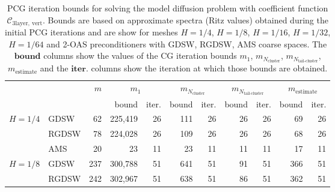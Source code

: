 \begin{table}[H]
\centering
\caption{PCG iteration bounds for solving the model diffusion problem with coefficient function $\mathcal{C}_{\mathrm{3layer, \ vert}}$. Bounds are based on approximate spectra (Ritz values) obtained during the initial PCG iterations and are show for meshes $H=1/4$, $H=1/8$, $H=1/16$, $H=1/32$, $H=1/64$ and 2-OAS preconditioners with GDSW, RGDSW, AMS coarse spaces. The $\textbf{bound}$ columns show the values of the CG iteration bounds $m_1$, $m_{N_{\text{cluster}}}$, $m_{N_{\text{tail-cluster}}}$, $m_{\text{estimate}}$ and the $\textbf{iter.}$ columns show the iteration at which those bounds are obtained.}
\label{tab:cg_iteration_bound_coef=3lvert}
\begin{tabular}{llrrrrrrrrr}
\toprule
 &  & \bfseries $m$ & \multicolumn{2}{|c|}{\bfseries $m_1$} & \multicolumn{2}{|c|}{\bfseries $m_{N_{\text{cluster}}}$} & \multicolumn{2}{|c|}{\bfseries $m_{N_{\text{tail-cluster}}}$} & \multicolumn{2}{|c|}{\bfseries $m_{\text{estimate}}$} \\
 &  &  & bound & iter. & bound & iter. & bound & iter. & bound & iter. \\
\midrule
\multirow[c]{3}{*}{\bfseries $H=1/4$} & GDSW & 62 & {\cellcolor[HTML]{E2E4FB}} \color[HTML]{000000} 225,419 & 26 & {\cellcolor[HTML]{ACB8F4}} \color[HTML]{000000} 111 & 26 & {\cellcolor[HTML]{768BEC}} \color[HTML]{F1F1F1} 26 & 26 & {\cellcolor[HTML]{405FE5}} \color[HTML]{F1F1F1} 69 & 26 \\
\cline{2-11}
\bfseries  & RGDSW & 78 & {\cellcolor[HTML]{E2E4FB}} \color[HTML]{000000} 224,028 & 26 & {\cellcolor[HTML]{768BEC}} \color[HTML]{F1F1F1} 109 & 26 & {\cellcolor[HTML]{ACB8F4}} \color[HTML]{000000} 26 & 26 & {\cellcolor[HTML]{405FE5}} \color[HTML]{F1F1F1} 68 & 26 \\
\cline{2-11}
\bfseries  & AMS & 20 & {\cellcolor[HTML]{405FE5}} \color[HTML]{F1F1F1} 23 & 11 & {\cellcolor[HTML]{405FE5}} \color[HTML]{F1F1F1} 23 & 11 & {\cellcolor[HTML]{E2E4FB}} \color[HTML]{000000} 11 & 11 & {\cellcolor[HTML]{405FE5}} \color[HTML]{F1F1F1} 17 & 11 \\
\cline{1-11} \cline{2-11}
\multirow[c]{3}{*}{\bfseries $H=1/8$} & GDSW & 237 & {\cellcolor[HTML]{E2E4FB}} \color[HTML]{000000} 300,788 & 51 & {\cellcolor[HTML]{ACB8F4}} \color[HTML]{000000} 641 & 51 & {\cellcolor[HTML]{768BEC}} \color[HTML]{F1F1F1} 91 & 51 & {\cellcolor[HTML]{405FE5}} \color[HTML]{F1F1F1} 366 & 51 \\
\cline{2-11}
\bfseries  & RGDSW & 242 & {\cellcolor[HTML]{E2E4FB}} \color[HTML]{000000} 302,967 & 51 & {\cellcolor[HTML]{ACB8F4}} \color[HTML]{000000} 638 & 51 & {\cellcolor[HTML]{768BEC}} \color[HTML]{F1F1F1} 86 & 51 & {\cellcolor[HTML]{405FE5}} \color[HTML]{F1F1F1} 362 & 51 \\

\end{tabular}
\end{table}
